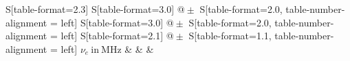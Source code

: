 \begin{table}[h!]
    \centering
    \caption{Stromstärken $I_1,I_2$ beim Auftreten des Maximums für verschiedene Anregungsfrequenzen $\nu_e$ mit dem jeweiligen Skalierungsfaktor}
    \label{tab:Werte}
    \begin{tabular}{
	S[table-format=2.3]
	S[table-format=3.0]
	@{${}\pm{}$}
	S[table-format=2.0, table-number-alignment = left]
	S[table-format=3.0]
	@{${}\pm{}$}
	S[table-format=2.0, table-number-alignment = left]
	S[table-format=2.1]
	@{${}\pm{}$}
	S[table-format=1.1, table-number-alignment = left]
	}
	\toprule
	{$\nu_e \ \mathrm{in} \ \si{\mega\hertz}$}		& 		& 
			& 		\\ 
	\midrule
    
    \bottomrule
    \end{tabular}
    \end{table}
